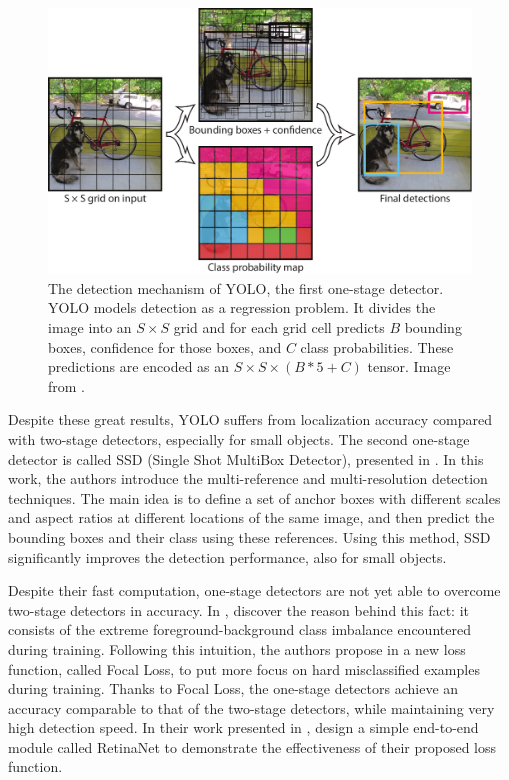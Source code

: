   \begin{figure}[h!]
 	\centering
 	\includegraphics[width=\linewidth]{images/yolo.png}
 	\caption{The detection mechanism of YOLO, the first one-stage detector. YOLO models detection as a regression problem. It divides the image into an $S \times S$ grid and for each grid cell predicts $B$ bounding boxes, confidence for those boxes,
 	and $C$ class probabilities. These predictions are encoded as an
 	$S \times S \times (B * 5 + C)$ tensor. Image from \cite{yolo}.}
 \end{figure}
 
 Despite these great results, YOLO suffers from localization accuracy compared with two-stage detectors, especially for small objects. The second one-stage detector is called SSD (Single Shot MultiBox Detector), presented in \cite{ssd}. In this work, the authors introduce the multi-reference and multi-resolution detection techniques. The main idea is to define a set of anchor boxes with different scales and aspect ratios at different locations of the same image, and then predict the bounding boxes and their class using these references. Using this method, SSD significantly improves the detection performance, also for small objects. 
 
 Despite their fast computation, one-stage detectors are not yet able to overcome two-stage detectors in accuracy. In \cite{focalloss}, \citeauthor{focalloss} discover the reason behind this fact: it consists of the extreme foreground-background class imbalance encountered during training. Following this intuition, the authors propose in \cite{focalloss} a new loss function, called Focal Loss, to put more focus on hard misclassified examples during training. Thanks to Focal Loss, the one-stage detectors achieve an accuracy comparable to that of the two-stage detectors, while maintaining very high detection speed. In their work presented in \cite{focalloss}, \citeauthor{focalloss} design a simple end-to-end module called RetinaNet to demonstrate the effectiveness of their proposed loss function. 
 
